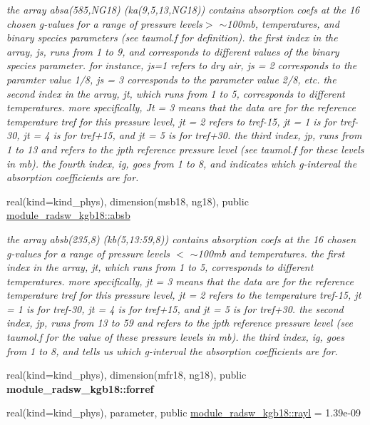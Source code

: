 \begin{Indent}
\begin{DoxyCompactItemize}
\begin{DoxyCompactList}\small\item\em the array absa(585,\+N\+G18) (ka(9,5,13,\+N\+G18)) contains absorption coefs at the 16 chosen g-\/values for a range of pressure levels$>$ $\sim$100mb, temperatures, and binary species parameters (see taumol.\+f for definition). the first index in the array, js, runs from 1 to 9, and corresponds to different values of the binary species parameter. for instance, js=1 refers to dry air, js = 2 corresponds to the paramter value 1/8, js = 3 corresponds to the parameter value 2/8, etc. the second index in the array, jt, which runs from 1 to 5, corresponds to different temperatures. more specifically, Jt = 3 means that the data are for the reference temperature tref for this pressure level, jt = 2 refers to tref-\/15, jt = 1 is for tref-\/30, jt = 4 is for tref+15, and jt = 5 is for tref+30. the third index, jp, runs from 1 to 13 and refers to the jpth reference pressure level (see taumol.\+f for these levels in mb). the fourth index, ig, goes from 1 to 8, and indicates which g-\/interval the absorption coefficients are for. \end{DoxyCompactList}\item 
real(kind=kind\+\_\+phys), dimension(msb18, ng18), public \hyperlink{group__module__radsw__kgbnn_ga858680db0ee5e9a599639844a91f8f06}{module\+\_\+radsw\+\_\+kgb18\+::absb}
\begin{DoxyCompactList}\small\item\em the array absb(235,8) (kb(5,13\+:59,8)) contains absorption coefs at the 16 chosen g-\/values for a range of pressure levels $<$ $\sim$100mb and temperatures. the first index in the array, jt, which runs from 1 to 5, corresponds to different temperatures. more specifically, jt = 3 means that the data are for the reference temperature tref for this pressure level, jt = 2 refers to the temperature tref-\/15, jt = 1 is for tref-\/30, jt = 4 is for tref+15, and jt = 5 is for tref+30. the second index, jp, runs from 13 to 59 and refers to the jpth reference pressure level (see taumol.\+f for the value of these pressure levels in mb). the third index, ig, goes from 1 to 8, and tells us which g-\/interval the absorption coefficients are for. \end{DoxyCompactList}\item 
real(kind=kind\+\_\+phys), dimension(mfr18, ng18), public {\bfseries module\+\_\+radsw\+\_\+kgb18\+::forref}
\item 
real(kind=kind\+\_\+phys), parameter, public \hyperlink{group__module__radsw__kgbnn_ga9cd3f07e259e4982c7ef2889fee6cccb}{module\+\_\+radsw\+\_\+kgb18\+::rayl} = 1.\+39e-\/09

\end{DoxyCompactItemize}
\end{Indent}
